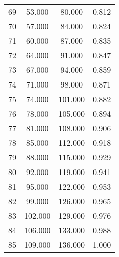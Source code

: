 \begin{tabular}{cccc}
  69 & 53.000 & 80.000 & 0.812 \\ 
  70 & 57.000 & 84.000 & 0.824 \\ 
  71 & 60.000 & 87.000 & 0.835 \\ 
  72 & 64.000 & 91.000 & 0.847 \\ 
  73 & 67.000 & 94.000 & 0.859 \\ 
  74 & 71.000 & 98.000 & 0.871 \\ 
  75 & 74.000 & 101.000 & 0.882 \\ 
  76 & 78.000 & 105.000 & 0.894 \\ 
  77 & 81.000 & 108.000 & 0.906 \\ 
  78 & 85.000 & 112.000 & 0.918 \\ 
  79 & 88.000 & 115.000 & 0.929 \\ 
  80 & 92.000 & 119.000 & 0.941 \\ 
  81 & 95.000 & 122.000 & 0.953 \\ 
  82 & 99.000 & 126.000 & 0.965 \\ 
  83 & 102.000 & 129.000 & 0.976 \\ 
  84 & 106.000 & 133.000 & 0.988 \\ 
  85 & 109.000 & 136.000 & 1.000 \\ 
   \hline
\end{tabular}
